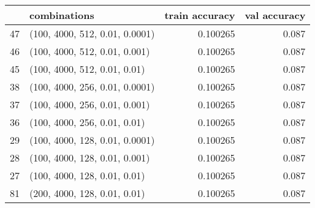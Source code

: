 \begin{tabular}{llrr}
\toprule
{} &                    combinations &  train accuracy &  val accuracy \\
\midrule
47 &  (100, 4000, 512, 0.01, 0.0001) &        0.100265 &         0.087 \\
46 &   (100, 4000, 512, 0.01, 0.001) &        0.100265 &         0.087 \\
45 &    (100, 4000, 512, 0.01, 0.01) &        0.100265 &         0.087 \\
38 &  (100, 4000, 256, 0.01, 0.0001) &        0.100265 &         0.087 \\
37 &   (100, 4000, 256, 0.01, 0.001) &        0.100265 &         0.087 \\
36 &    (100, 4000, 256, 0.01, 0.01) &        0.100265 &         0.087 \\
29 &  (100, 4000, 128, 0.01, 0.0001) &        0.100265 &         0.087 \\
28 &   (100, 4000, 128, 0.01, 0.001) &        0.100265 &         0.087 \\
27 &    (100, 4000, 128, 0.01, 0.01) &        0.100265 &         0.087 \\
81 &    (200, 4000, 128, 0.01, 0.01) &        0.100265 &         0.087 \\
\bottomrule
\end{tabular}
